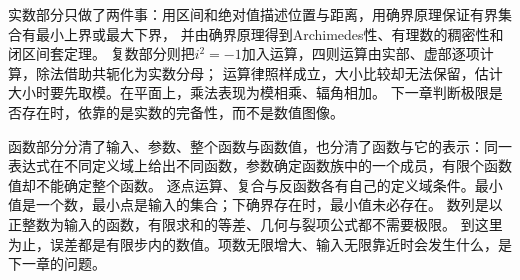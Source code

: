 实数部分只做了两件事：用区间和绝对值描述位置与距离，用确界原理保证有界集合有最小上界或最大下界，
并由确界原理得到Archimedes性、有理数的稠密性和闭区间套定理。
复数部分则把$i^2=-1$加入运算，四则运算由实部、虚部逐项计算，除法借助共轭化为实数分母；
运算律照样成立，大小比较却无法保留，估计大小时要先取模。在平面上，乘法表现为模相乘、辐角相加。
下一章判断极限是否存在时，依靠的是实数的完备性，而不是数值图像。

函数部分分清了输入、参数、整个函数与函数值，也分清了函数与它的表示：同一表达式在不同定义域上给出不同函数，参数确定函数族中的一个成员，有限个函数值却不能确定整个函数。
逐点运算、复合与反函数各有自己的定义域条件。最小值是一个数，最小点是输入的集合；下确界存在时，最小值未必存在。
数列是以正整数为输入的函数，有限求和的等差、几何与裂项公式都不需要极限。
到这里为止，误差都是有限步内的数值。项数无限增大、输入无限靠近时会发生什么，是下一章的问题。
